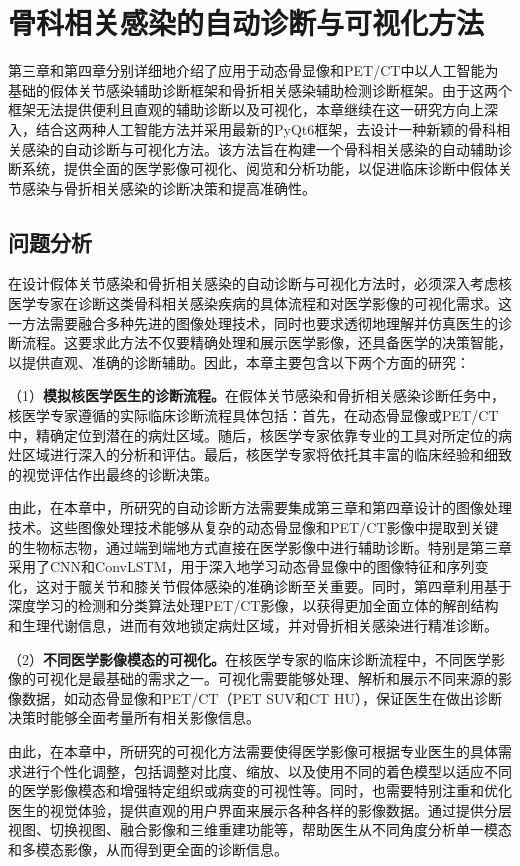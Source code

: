 \chapter{骨科相关感染的自动诊断与可视化方法}

第三章和第四章分别详细地介绍了应用于动态骨显像和PET/CT中以人工智能为基础的假体关节感染辅助诊断框架和骨折相关感染辅助检测诊断框架。由于这两个框架无法提供便利且直观的辅助诊断以及可视化，本章继续在这一研究方向上深入，结合这两种人工智能方法并采用最新的PyQt6框架，去设计一种新颖的骨科相关感染的自动诊断与可视化方法。该方法旨在构建一个骨科相关感染的自动辅助诊断系统，提供全面的医学影像可视化、阅览和分析功能，以促进临床诊断中假体关节感染与骨折相关感染的诊断决策和提高准确性。

\section{问题分析}

在设计假体关节感染和骨折相关感染的自动诊断与可视化方法时，必须深入考虑核医学专家在诊断这类骨科相关感染疾病的具体流程和对医学影像的可视化需求。这一方法需要融合多种先进的图像处理技术，同时也要求透彻地理解并仿真医生的诊断流程。这要求此方法不仅要精确处理和展示医学影像，还具备医学的决策智能，以提供直观、准确的诊断辅助。因此，本章主要包含以下两个方面的研究：

（1）\textbf{模拟核医学医生的诊断流程。}在假体关节感染和骨折相关感染诊断任务中，核医学专家遵循的实际临床诊断流程具体包括：首先，在动态骨显像或PET/CT中，精确定位到潜在的病灶区域。随后，核医学专家依靠专业的工具对所定位的病灶区域进行深入的分析和评估。最后，核医学专家将依托其丰富的临床经验和细致的视觉评估作出最终的诊断决策。

由此，在本章中，所研究的自动诊断方法需要集成第三章和第四章设计的图像处理技术。这些图像处理技术能够从复杂的动态骨显像和PET/CT影像中提取到关键的生物标志物，通过端到端地方式直接在医学影像中进行辅助诊断。特别是第三章采用了CNN和ConvLSTM，用于深入地学习动态骨显像中的图像特征和序列变化，这对于髋关节和膝关节假体感染的准确诊断至关重要。同时，第四章利用基于深度学习的检测和分类算法处理PET/CT影像，以获得更加全面立体的解剖结构和生理代谢信息，进而有效地锁定病灶区域，并对骨折相关感染进行精准诊断。

（2）\textbf{不同医学影像模态的可视化。}在核医学专家的临床诊断流程中，不同医学影像的可视化是最基础的需求之一。可视化需要能够处理、解析和展示不同来源的影像数据，如动态骨显像和PET/CT（PET SUV和CT HU），保证医生在做出诊断决策时能够全面考量所有相关影像信息。

由此，在本章中，所研究的可视化方法需要使得医学影像可根据专业医生的具体需求进行个性化调整，包括调整对比度、缩放、以及使用不同的着色模型以适应不同的医学影像模态和增强特定组织或病变的可视性等。同时，也需要特别注重和优化医生的视觉体验，提供直观的用户界面来展示各种各样的影像数据。通过提供分层视图、切换视图、融合影像和三维重建功能等，帮助医生从不同角度分析单一模态和多模态影像，从而得到更全面的诊断信息。

